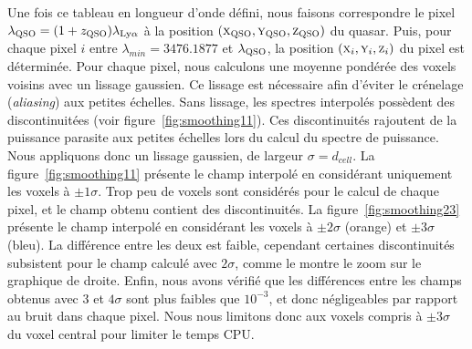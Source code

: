 Une fois ce tableau en longueur d'onde défini, nous faisons correspondre le pixel $\lambda_{\textsc{QSO}} = (1+z_{\textsc{QSO}}) \lambda_{\mathrm{Ly}\alpha}$ à la position $(\textsc{x}_{\textsc{QSO}}, \textsc{y}_{\textsc{QSO}}, \textsc{z}_{\textsc{QSO}})$ du quasar.
Puis, pour chaque pixel $i$ entre $\lambda_{min} = \num{3476.1877}$ et $\lambda_{\textsc{QSO}}$, la position $(\textsc{x}_i, \textsc{y}_i, \textsc{z}_i)$ du pixel est déterminée.
Pour chaque pixel, nous calculons une moyenne pondérée des voxels voisins avec un lissage gaussien.
  Ce lissage est nécessaire afin d'éviter le crénelage (\emph{aliasing}) aux petites échelles.
  Sans lissage, les spectres interpolés possèdent des discontinuitées (voir figure~\ref{fig:smoothing11}). Ces discontinuités rajoutent de la puissance parasite aux petites échelles lors du calcul du spectre de puissance.
  Nous appliquons donc un lissage gaussien, de largeur $\sigma = d_{cell}$.
La figure~\ref{fig:smoothing11} présente le champ interpolé en considérant uniquement les voxels à $\pm 1 \sigma$. Trop peu de voxels sont considérés pour le calcul de chaque pixel, et le champ obtenu contient des discontinuités. La figure~\ref{fig:smoothing23} présente le champ interpolé en considérant les voxels à $\pm 2 \sigma$ (orange) et $\pm 3 \sigma$ (bleu). La différence entre les deux est faible, cependant certaines discontinuités subsistent pour le champ calculé avec $2 \sigma$, comme le montre le zoom sur le graphique de droite. Enfin, nous avons vérifié que les différences entre les champs obtenus avec $3$ et $4 \sigma$ sont plus faibles que $10^{-3}$, et donc négligeables par rapport au bruit dans chaque pixel. Nous nous limitons donc aux voxels compris à $\pm 3 \sigma$ du voxel central pour limiter le temps CPU.
